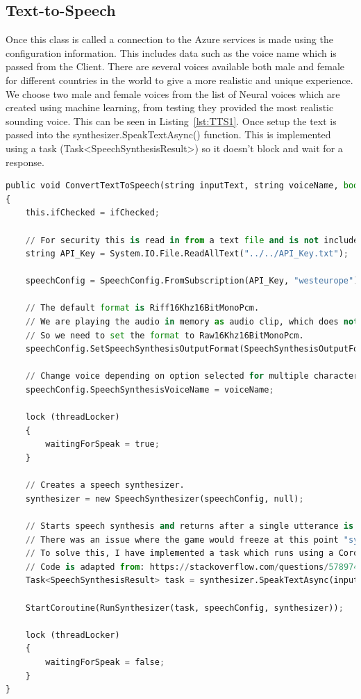 \subsection{Text-to-Speech}
Once this class is called a connection to the Azure services is made using the configuration information. This includes data such as the voice name which is passed from the Client. There are several voices available both male and female for different countries in the world to give a more realistic and unique experience. We choose two male and female voices from the list of Neural voices which are created using machine learning, from testing they provided the most realistic sounding voice. This can be seen in Listing~\ref{lst:TTS1}. Once setup the text is passed into the synthesizer.SpeakTextAsync() function. This is implemented using a task (Task<SpeechSynthesisResult>) so it doesn't block and wait for a response.

\begin{lstlisting}[caption={Text to Speech - Setup and request},label={lst:TTS1},language=python]
public void ConvertTextToSpeech(string inputText, string voiceName, bool ifChecked)
{
    this.ifChecked = ifChecked;

    // For security this is read in from a text file and is not included on Github. 
    string API_Key = System.IO.File.ReadAllText("../../API_Key.txt");

    speechConfig = SpeechConfig.FromSubscription(API_Key, "westeurope");
    
    // The default format is Riff16Khz16BitMonoPcm.
    // We are playing the audio in memory as audio clip, which does not require riff header.
    // So we need to set the format to Raw16Khz16BitMonoPcm.
    speechConfig.SetSpeechSynthesisOutputFormat(SpeechSynthesisOutputFormat.Raw16Khz16BitMonoPcm);

    // Change voice depending on option selected for multiple characters of different genders and ethnicities.
    speechConfig.SpeechSynthesisVoiceName = voiceName;

    lock (threadLocker)
    {
        waitingForSpeak = true;
    }

    // Creates a speech synthesizer.
    synthesizer = new SpeechSynthesizer(speechConfig, null);

    // Starts speech synthesis and returns after a single utterance is synthesized.
    // There was an issue where the game would freeze at this point "synthesizer.SpeakTextAsync(inputText)" blocks until the task is complete. 
    // To solve this, I have implemented a task which runs using a Coroutine that waits until the result from Azure is returned. 
    // Code is adapted from: https://stackoverflow.com/questions/57897464/unity-freezes-for-2-seconds-while-microsoft-azure-text-to-speech-processes-input
    Task<SpeechSynthesisResult> task = synthesizer.SpeakTextAsync(inputText);

    StartCoroutine(RunSynthesizer(task, speechConfig, synthesizer));

    lock (threadLocker)
    {
        waitingForSpeak = false;
    }
}
\end{lstlisting}

